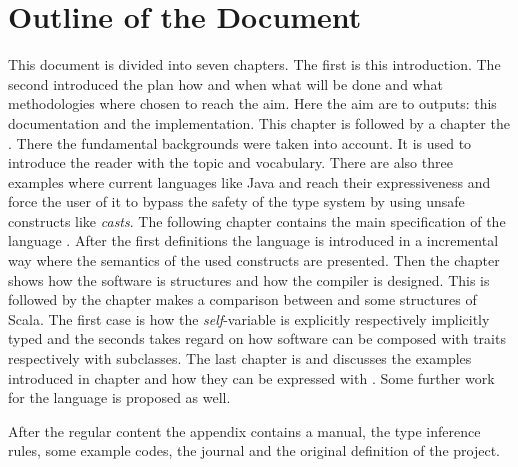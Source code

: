 \section{Outline of the Document}
This document is divided into seven chapters. The first is this introduction. The second
\emph{} introduced the plan how and
when what will be done and what methodologies where chosen to reach
the aim. Here the aim are to outputs: this documentation and
the implementation. This chapter is followed by a chapter the
\emph{}. There the fundamental
backgrounds were taken into account. It is used to introduce the
reader with the topic and vocabulary. There are also three examples
where current languages like Java and \cs reach their expressiveness
and force the user of it to bypass the safety of the type system
by using unsafe constructs like \emph{casts}. The following
chapter \emph{} contains
the main specification of the language \ooplss. After the first
definitions the language is introduced in a incremental way where
the semantics of the used constructs are presented. Then the chapter
\emph{} shows how the software is
structures and how the compiler is designed. This is followed by the
chapter \emph{} makes a comparison between
\ooplss and some structures of Scala. The first case is how the
\emph{self}-variable is explicitly respectively implicitly typed and
the seconds takes regard on how software can be composed with traits
respectively with subclasses. The last chapter is
\emph{} and discusses the examples
introduced in chapter \emph{} and how
they can be expressed with \ooplss. Some further work for the language
is proposed as well.

After the regular content the appendix contains a manual, the type
inference rules, some example codes, the journal and the original
definition of the project.

